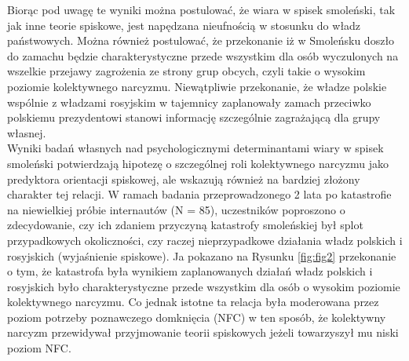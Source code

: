 \documentclass[man]{apa6}
\begin{document}
	Biorąc pod uwagę te wyniki można postulować, że wiara w spisek smoleński, tak jak inne teorie spiskowe, jest napędzana nieufnością w stosunku do władz państwowych. Można również postulować, że przekonanie iż w Smoleńsku doszło do zamachu będzie charakterystyczne przede wszystkim dla osób wyczulonych na wszelkie przejawy zagrożenia ze strony grup obcych, czyli takie o wysokim poziomie kolektywnego narcyzmu. Niewątpliwie przekonanie, że władze polskie wspólnie z władzami rosyjskim w tajemnicy zaplanowały zamach przeciwko polskiemu prezydentowi stanowi informację szczególnie zagrażającą dla grupy własnej.\\
	Wyniki badań własnych nad psychologicznymi determinantami wiary w spisek smoleński potwierdzają hipotezę o szczególnej roli kolektywnego narcyzmu jako predyktora orientacji spiskowej, ale wskazują również na bardziej złożony charakter tej relacji. W ramach badania przeprowadzonego 2 lata po katastrofie na niewielkiej próbie internautów (N = 85), uczestników poproszono o zdecydowanie, czy ich zdaniem przyczyną katastrofy smoleńskiej był splot przypadkowych okoliczności, czy raczej nieprzypadkowe działania władz polskich i rosyjskich (wyjaśnienie spiskowe). Ja pokazano na Rysunku \ref{fig:fig2} przekonanie o tym, że katastrofa była wynikiem zaplanowanych działań władz polskich i rosyjskich było charakterystyczne przede wszystkim dla osób o wysokim poziomie kolektywnego narcyzmu. Co jednak istotne ta relacja była moderowana przez poziom potrzeby poznawczego domknięcia (NFC) w ten sposób, że kolektywny narcyzm przewidywał przyjmowanie teorii spiskowych jeżeli towarzyszył mu niski poziom NFC.\\

	\begin{figure*}[htbp]
   		\centering
   		\caption{Kolektywny narcyzm a prawdopodobieństwo wiary w spisek smoleński wśród osób o różnych nasileniach potrzeby poznawczego domknięcia (NFC).}
   		\label{fig:fig2}
	\end{figure*}
\end{document}
